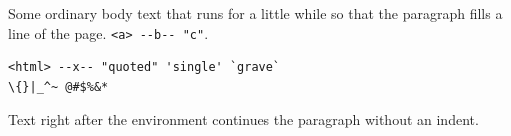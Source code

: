 \documentclass{article}
\begin{document}
Some ordinary body text that runs for a little while so that the paragraph fills a line of the page. \verb|<a> --b-- "c"|.
\begin{verbatim}
<html> --x-- "quoted" 'single' `grave`
\{}|_^~ @#$%&*
\end{verbatim}
Text right after the environment continues the paragraph without an indent.
\end{document}
